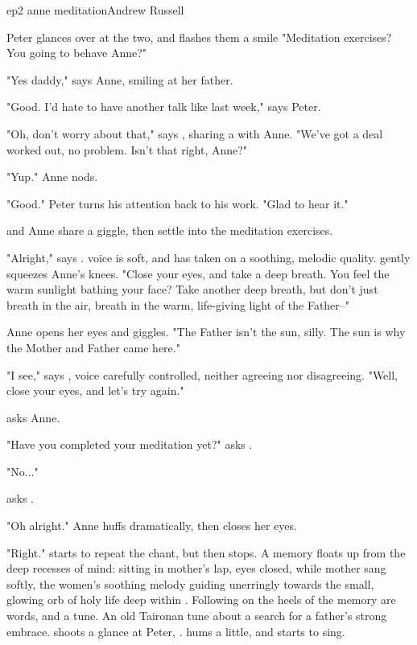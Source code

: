 \documentclass{book}
\begin{document}
\begin{childnode}{ep2 anne meditation}{Andrew Russell}


    Peter glances over at the two, and flashes them a smile "Meditation exercises? You going to behave Anne?"

    "Yes daddy," says Anne, smiling at her father.

    "Good. I'd hate to have another talk like last week," says Peter.

    "Oh, don't worry about that," says \name{}, sharing a  with Anne. "We've got a deal worked out, no problem. Isn't that right, Anne?"

    "Yup." Anne nods.

    "Good." Peter turns his attention back to his work. "Glad to hear it."

    \name{} and Anne share a giggle, then settle into the meditation exercises.

    "Alright," says \name{}. \HisHer{} voice is soft, and has taken on a soothing, melodic quality. \HeShe{} gently squeezes Anne's knees. "Close your eyes, and take a deep breath. You feel the warm sunlight bathing your face? 
    Take another deep breath, but don't just breath in the air, breath in the warm, life-giving light of the Father--"

    Anne opens her eyes and giggles. "The Father isn't the sun, silly. The sun is why the Mother and Father came here."

    "I see," says \name{}, \hisher{} voice carefully controlled, neither agreeing nor disagreeing. "Well, close your eyes, and let's try again."

     asks Anne.

    "Have you completed your meditation yet?" asks \name{}.

    "No..."

     asks \name{}.

    "Oh alright." Anne huffs dramatically, then closes her eyes.

    "Right." \name{} starts to repeat the chant, but then stops. A memory floats up from the deep recesses of \hisher{} mind: sitting in \hisher{} mother's lap, \hisher{} eyes closed, while \hisher{} mother sang softly, the women's soothing melody guiding 
    \himher{} unerringly towards the small, glowing orb of holy life deep within \himher{}. Following on the heels of the memory are words, and a tune. An old Taironan tune about a search for a father's strong embrace. \name{} shoots 
    a glance at Peter, . \name{} hums a little, and starts to sing.


\end{childnode}
\end{document}
